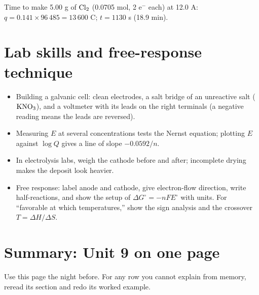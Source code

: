 \documentclass[11pt]{article}
\begin{document}
 Time to make 5.00 g of $\ce{Cl2}$ (0.0705 mol, 2 e$^-$ each) at 12.0 A: $q = 0.141 \times 96\,485 = 13\,600$ C; $t = 1130$ s (18.9 min).

\section{Lab skills and free-response technique}\label{t:lab}
\begin{itemize}
\item Building a galvanic cell: clean electrodes, a salt bridge of an unreactive salt ($\ce{KNO3}$), and a voltmeter with its leads on the right terminals (a negative reading means the leads are reversed).
\item Measuring $E$ at several concentrations tests the Nernst equation; plotting $E$ against $\log Q$ gives a line of slope $-0.0592/n$.
\item In electrolysis labs, weigh the cathode before and after; incomplete drying makes the deposit look heavier.
\item Free response: label anode and cathode, give electron-flow direction, write half-reactions, and show the setup of $\Delta G^\circ = -nFE^\circ$ with units. For ``favorable at which temperatures,'' show the sign analysis and the crossover $T = \Delta H/\Delta S$.
\end{itemize}

\clearpage
\section*{Summary: Unit 9 on one page}
Use this page the night before. For any row you cannot explain from memory, reread its section and redo its worked example.
\end{document}
